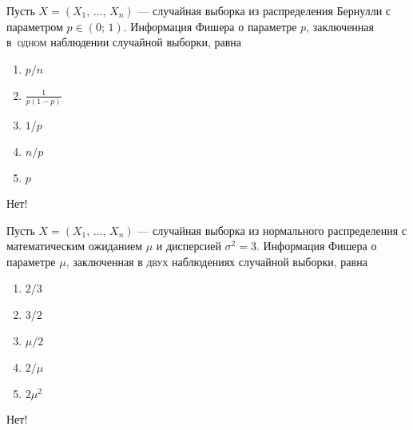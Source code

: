 \documentclass[t]{beamer}
\begin{document}
 \begin{frame} \label{22-No} 
\begin{block}{22} 

  Пусть $X = (X_1, \, \ldots, \, X_n)$ — случайная выборка из распределения Бернулли с параметром $p \in (0;\,1)$. Информация Фишера о параметре $p$, заключенная в~\textsc{одном} наблюдении случайной выборки, равна


 \end{block} 
\begin{enumerate} 
\item[] \hyperlink{22-No}{\beamergotobutton{} $p/n$}
\item[] \hyperlink{22-Yes}{\beamergotobutton{} $\frac{1}{p(1-p)}$}
\item[] \hyperlink{22-No}{\beamergotobutton{} $1/p$}
\item[] \hyperlink{22-No}{\beamergotobutton{} $n/p$}
\item[] \hyperlink{22-No}{\beamergotobutton{} $p$}
\end{enumerate} 

 \alert{Нет!} 
\end{frame} 


 \begin{frame} \label{23-No} 
\begin{block}{23} 

  Пусть $X = (X_1, \, \ldots, \, X_n)$ — случайная выборка из нормального распределения с математическим ожиданием $\mu$ и дисперсией $\sigma^2 = 3$. Информация Фишера о параметре $\mu$, заключенная в \textsc{двух} наблюдениях случайной выборки, равна


 \end{block} 
\begin{enumerate} 
\item[] \hyperlink{23-Yes}{\beamergotobutton{} $2 / 3$}
\item[] \hyperlink{23-No}{\beamergotobutton{} $3 / 2$}
\item[] \hyperlink{23-No}{\beamergotobutton{} $\mu / 2$}
\item[] \hyperlink{23-No}{\beamergotobutton{} $2 / \mu$}
\item[] \hyperlink{23-No}{\beamergotobutton{} $2 \mu^2$}
\end{enumerate} 

 \alert{Нет!} 
\end{frame} 
\end{document}
